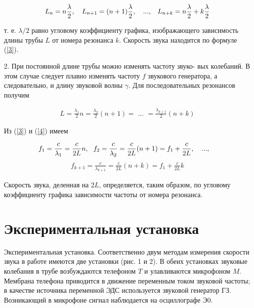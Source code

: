 \documentclass[12pt]{article}
\begin{document}
\begin{align}\notag
    L_n = n\frac{\lambda}{2},\text{     }\text{     }\text{     }
    L_{n+1} = (n+1)\frac{\lambda}{2},\text{     }\text{     }
    \text{      ...,    }\text{     }\text{     }
    L_{n+k} = n\frac{\lambda}{2}+k\frac{\lambda}{2}
\end{align}


т. е. $\lambda/2$ равно угловому коэффициенту графика, изображающего зависимость длины трубы $L$ от номера резонанса $k$. Скорость звука находится по формуле (\ref{3}).

2. При постоянной длине трубы можно изменять частоту звуко- вых колебаний. В этом случае следует плавно изменять частоту $f$ звукового генератора, а следовательно, и длину звуковой волны $\gamma$. Для последовательных резонансов получим

\begin{align}\label{4}
    L = \frac{\lambda_1}{2}n =\frac{\lambda_2}{2}(n+1) = \text{    ...     }=\frac{\lambda_{k+1}}{2}(n+k)
\end{align}

Из (\ref{3}) и (\ref{4}) имеем

\begin{align}\notag
    f_1 = \frac{c}{\lambda_1} = \frac{c}{2L}n, \text{   }\text{   } f_2 = \frac{c}{\lambda_2} = \frac{c}{2L}(n+1) = f_1 + \frac{c}{2L}, \text{     }\text{     }
    \text{      ...,    }\text{     }\text{     }
\end{align}
\begin{align}\label{5}
    f_{k+1} = \frac{c}{\lambda_{k+1}} = \frac{c}{2L}(n+k) = f_1 + \frac{c}{2L}k
\end{align}

Скорость звука, деленная на 2$L$, определяется, таким образом, по угловому коэффициенту графика зависимости частоты от номера резонанса.

\section*{Экспериментальная установка}
Экспериментальная установка. Соответственно двум методам измерения скорости звука в работе имеются две установки (рис. 1 и 2). В обеих установках звуковые колебания в трубе возбуждаются телефоном $T$ и улавливаются микрофоном $M$. Мембрана телефона приводится в движение переменным током звуковой частоты; в качестве источника переменной ЭДС используется звуковой генератор ГЗ. Возникающий в микрофоне сигнал наблюдается на осциллографе Э$0$.
\end{document}
